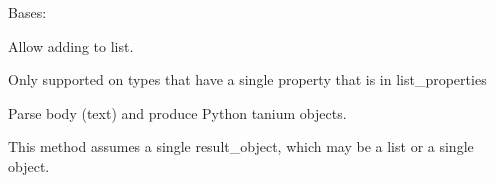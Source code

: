 \documentclass[letterpaper,10pt,english]{sphinxmanual}
\begin{document}
\begin{fulllineitems}
\label{taniumpy.object_types:taniumpy.object_types.base.BaseType}
Bases: \href{http://docs.python.org/2.7/library/functions.html\#object}{}

\begin{fulllineitems}
\label{taniumpy.object_types:taniumpy.object_types.base.BaseType.append}
Allow adding to list.

Only supported on types that have a single property
that is in list\_properties

\end{fulllineitems}


\begin{fulllineitems}
\label{taniumpy.object_types:taniumpy.object_types.base.BaseType.explode_json}
\end{fulllineitems}


\begin{fulllineitems}
\label{taniumpy.object_types:taniumpy.object_types.base.BaseType.flatten_jsonable}
\end{fulllineitems}


\begin{fulllineitems}
\label{taniumpy.object_types:taniumpy.object_types.base.BaseType.fromSOAPBody}
Parse body (text) and produce Python tanium objects.

This method assumes a single result\_object, which
may be a list or a single object.

\end{fulllineitems}



\end{fulllineitems}
\end{document}
